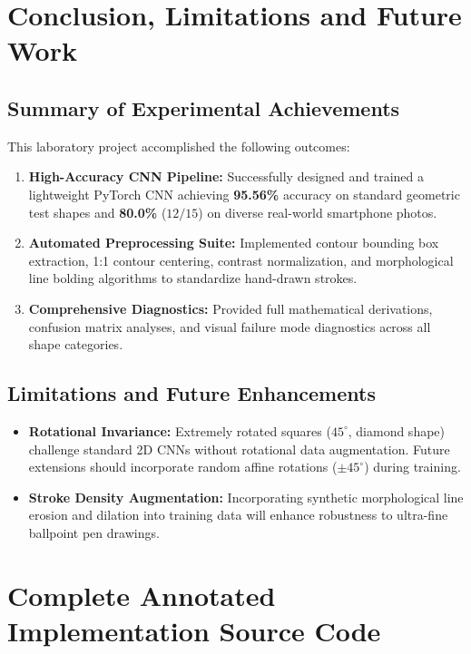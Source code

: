 \documentclass[11pt,a4paper,oneside]{report}
\begin{document}
\chapter{Conclusion, Limitations and Future Work}

\section{Summary of Experimental Achievements}
This laboratory project accomplished the following outcomes:
\begin{enumerate}[leftmargin=*]
    \item \textbf{High-Accuracy CNN Pipeline:} Successfully designed and trained a lightweight PyTorch CNN achieving \textbf{95.56\%} accuracy on standard geometric test shapes and \textbf{80.0\%} ($12/15$) on diverse real-world smartphone photos.
    \item \textbf{Automated Preprocessing Suite:} Implemented contour bounding box extraction, 1:1 contour centering, contrast normalization, and morphological line bolding algorithms to standardize hand-drawn strokes.
    \item \textbf{Comprehensive Diagnostics:} Provided full mathematical derivations, confusion matrix analyses, and visual failure mode diagnostics across all shape categories.
\end{enumerate}

\section{Limitations and Future Enhancements}
\begin{itemize}[leftmargin=*]
    \item \textbf{Rotational Invariance:} Extremely rotated squares ($45^\circ$, diamond shape) challenge standard 2D CNNs without rotational data augmentation. Future extensions should incorporate random affine rotations ($\pm 45^\circ$) during training.
    \item \textbf{Stroke Density Augmentation:} Incorporating synthetic morphological line erosion and dilation into training data will enhance robustness to ultra-fine ballpoint pen drawings.
\end{itemize}

\chapter{Complete Annotated Implementation Source Code}
\end{document}
